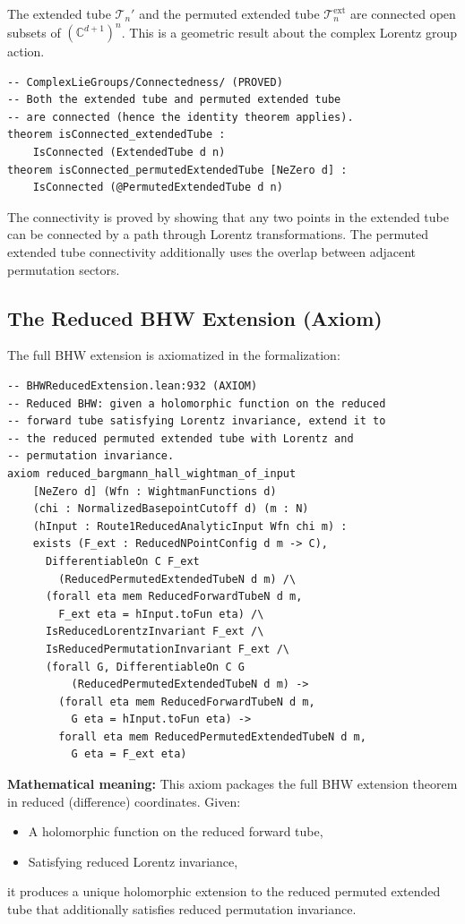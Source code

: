 \documentclass[11pt,a4paper]{article}
\begin{document}
The extended tube $\mathscr{T}_n'$ and the permuted extended tube
$\mathscr{T}_n^{\mathrm{ext}}$ are connected open subsets of
$(\mathbb{C}^{d+1})^n$. This is a geometric result about the
complex Lorentz group action.

\begin{lstlisting}
-- ComplexLieGroups/Connectedness/ (PROVED)
-- Both the extended tube and permuted extended tube
-- are connected (hence the identity theorem applies).
theorem isConnected_extendedTube :
    IsConnected (ExtendedTube d n)
theorem isConnected_permutedExtendedTube [NeZero d] :
    IsConnected (@PermutedExtendedTube d n)
\end{lstlisting}

\noindent The connectivity is proved by showing that any two points in the
extended tube can be connected by a path through Lorentz transformations.
The permuted extended tube connectivity additionally uses the overlap between
adjacent permutation sectors.

\subsection{The Reduced BHW Extension (Axiom)}

The full BHW extension is axiomatized in the formalization:

\begin{lstlisting}[style=leanaxiom]
-- BHWReducedExtension.lean:932 (AXIOM)
-- Reduced BHW: given a holomorphic function on the reduced
-- forward tube satisfying Lorentz invariance, extend it to
-- the reduced permuted extended tube with Lorentz and
-- permutation invariance.
axiom reduced_bargmann_hall_wightman_of_input
    [NeZero d] (Wfn : WightmanFunctions d)
    (chi : NormalizedBasepointCutoff d) (m : N)
    (hInput : Route1ReducedAnalyticInput Wfn chi m) :
    exists (F_ext : ReducedNPointConfig d m -> C),
      DifferentiableOn C F_ext
        (ReducedPermutedExtendedTubeN d m) /\
      (forall eta mem ReducedForwardTubeN d m,
        F_ext eta = hInput.toFun eta) /\
      IsReducedLorentzInvariant F_ext /\
      IsReducedPermutationInvariant F_ext /\
      (forall G, DifferentiableOn C G
          (ReducedPermutedExtendedTubeN d m) ->
        (forall eta mem ReducedForwardTubeN d m,
          G eta = hInput.toFun eta) ->
        forall eta mem ReducedPermutedExtendedTubeN d m,
          G eta = F_ext eta)
\end{lstlisting}

\noindent\textbf{Mathematical meaning:} This axiom packages the full BHW
extension theorem in reduced (difference) coordinates. Given:
\begin{itemize}
\item A holomorphic function on the reduced forward tube,
\item Satisfying reduced Lorentz invariance,
\end{itemize}
it produces a unique holomorphic extension to the reduced permuted extended
tube that additionally satisfies reduced permutation invariance.
\end{document}

